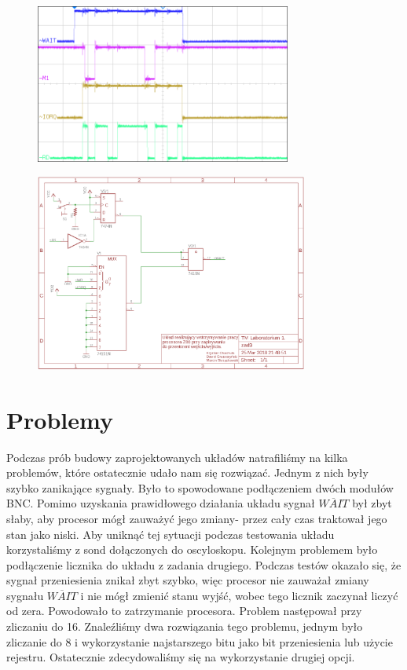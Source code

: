 \documentclass[fleqn]{article}
\begin{document}
\begin{figure}[H]
	\centering
	\includegraphics[width=0.75\textwidth]{img/3c.png}
	\caption{}
\end{figure}

\begin{figure}[H]
	\centering
	\includegraphics[width=0.8\textwidth]{img/z3.png}
	\caption{}
\end{figure}

\section{Problemy}

Podczas prób budowy zaprojektowanych układów natrafiliśmy na kilka problemów, które ostatecznie udało nam się rozwiązać.
Jednym z nich były szybko zanikające sygnały. Było to spowodowane podłączeniem dwóch modułów BNC. Pomimo uzyskania prawidłowego działania układu sygnał $\overline{WAIT}$ był zbyt słaby, aby procesor mógł zauważyć jego zmiany- przez cały czas traktował jego stan jako niski. Aby uniknąć tej sytuacji podczas testowania układu korzystaliśmy z sond dołączonych do oscyloskopu.
Kolejnym problemem było podłączenie licznika do układu z zadania drugiego. Podczas testów okazało się, że sygnał przeniesienia znikał zbyt szybko, więc procesor nie zauważał zmiany sygnału $\overline{WAIT}$ i nie mógł zmienić stanu wyjść, wobec tego licznik zaczynał liczyć od zera. Powodowało to zatrzymanie procesora. Problem następował przy zliczaniu do 16. Znaleźliśmy dwa rozwiązania tego problemu, jednym było zliczanie do 8 i wykorzystanie najstarszego bitu jako bit przeniesienia lub użycie rejestru. Ostatecznie zdecydowaliśmy się na wykorzystanie drugiej opcji.
\end{document}
